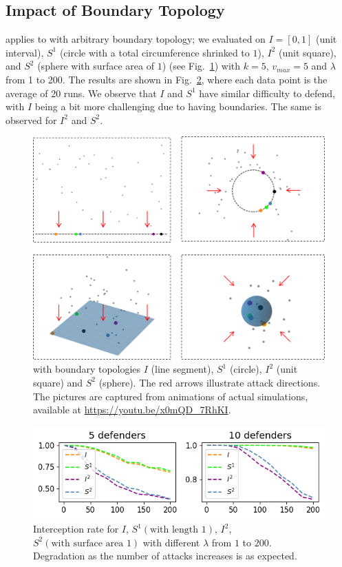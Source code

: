 \subsection{Impact of Boundary Topology}
\ours applies to \prob with arbitrary boundary topology; we evaluated \ours on $I=[0, 1]$ (unit interval), $S^1$ (circle with a total circumference shrinked to $1$), $I^2$ (unit square), and $S^2$ (sphere with surface area of $1$) (see Fig.~\ref{fig:topology}) with $k = 5$, $v_{max} = 5$ and $\lambda$ from 1 to 200. 
The results are shown in Fig.~\ref{fig:geo}, where each data point is the average of 20 runs. 
We observe that $I$ and $S^1$ have similar difficulty to defend, with $I$ being a bit more challenging due to having boundaries. The same is observed for $I^2$ and $S^2$.
\begin{figure}[h!]
\vspace{2mm}
    \centering
    \includegraphics[width=\linewidth]{chapters/pd/fig/topology.png}
    \caption{\prob with boundary topologies $I$ (line segment), $S^1$ (circle), $I^2$ (unit square) and $S^2$ (sphere). The red arrows illustrate attack directions. The pictures are captured from animations of actual simulations, available at \url{https://youtu.be/x0mQD\_7RhKI}.}
    \label{fig:topology}
    \vspace{-4mm}
\end{figure}

\begin{figure}[h!]
\vspace{1mm}
    \centering
    \includegraphics[width=\linewidth]{chapters/pd/fig/geo.png}
    \caption{Interception rate for $I$, $S^1 (\text{with length 1})$, $I^2$, $S^2 (\text{with surface area 1})$ with different $\lambda$ from $1$ to $200$. Degradation as the number of attacks increases is as expected.}
    \label{fig:geo}
\end{figure}


